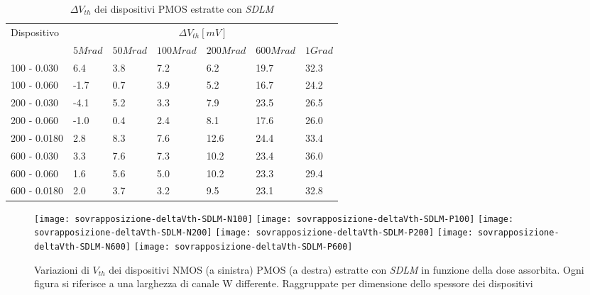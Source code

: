 \begin{table}[H]
  \renewcommand{\arraystretch}{1.3}
  \begin{tabular}{m{2.1cm}  m{1.1cm} m{1.3cm} m{1.5cm} m{1.5cm} m{1.5cm} m{1cm}}
    \toprule
    \multirow{2}{*}{Dispositivo} & \multicolumn{6}{c}{$\Delta V_{th} [mV] $}                                                          \\
    \cmidrule{2-7}
                                 & $5Mrad$                                   & $50Mrad$ & $100Mrad$ & $200Mrad$ & $600Mrad$ & $1Grad$ \\
    \midrule
    100 - 0.030                     & 6.4                                       & 3.8      & 7.2       & 6.2       & 19.7      & 32.3    \\
    \hline
    100 - 0.060                     & -1.7                                      & 0.7      & 3.9       & 5.2       & 16.7      & 24.2    \\
    \hline
    200 - 0.030                     & -4.1                                      & 5.2      & 3.3       & 7.9       & 23.5      & 26.5    \\
    \hline
    200 - 0.060                     & -1.0                                      & 0.4      & 2.4       & 8.1       & 17.6      & 26.0    \\
    \hline
    200 - 0.0180                    & 2.8                                       & 8.3      & 7.6       & 12.6      & 24.4      & 33.4    \\
    \hline
    600 - 0.030                     & 3.3                                       & 7.6      & 7.3       & 10.2      & 23.4      & 36.0    \\
    \hline
    600 - 0.060                     & 1.6                                       & 5.6      & 5.0       & 10.2      & 23.3      & 29.4    \\
    \hline
    600 - 0.0180                    & 2.0                                       & 3.7      & 3.2       & 9.5       & 23.1      & 32.8    \\
    \bottomrule
  \end{tabular}
  \caption{$\Delta V_{th}$ dei dispositivi PMOS estratte con \emph{SDLM}}
  \label{tab:deltaVthSDLMP}
\end{table}

\begin{figure}[H]
  \centering
  \texttt{[image: sovrapposizione-deltaVth-SDLM-N100]}
  \texttt{[image: sovrapposizione-deltaVth-SDLM-P100]}
  \texttt{[image: sovrapposizione-deltaVth-SDLM-N200]}
  \texttt{[image: sovrapposizione-deltaVth-SDLM-P200]}
  \texttt{[image: sovrapposizione-deltaVth-SDLM-N600]}
  \texttt{[image: sovrapposizione-deltaVth-SDLM-P600]}
  \caption{Variazioni di $V_{th}$ dei dispositivi NMOS (a sinistra) PMOS (a destra) estratte con \emph{SDLM} in funzione della dose assorbita. Ogni figura si riferisce a una larghezza di canale W differente. Raggruppate per dimensione dello spessore dei dispositivi}
  \label{fig:deltaVthSDLM}
\end{figure}

